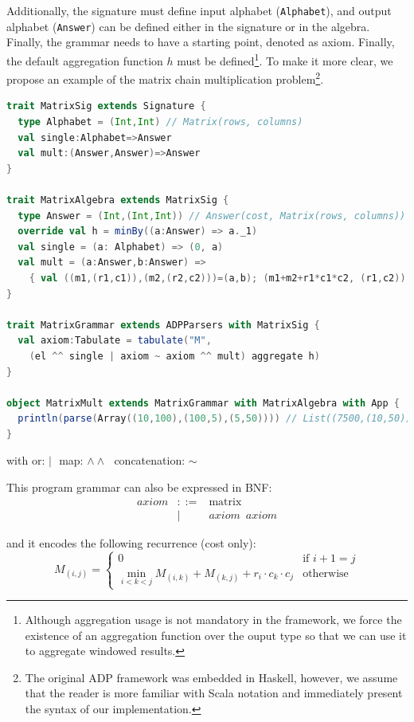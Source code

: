 Additionally, the signature must define input alphabet ({\tt Alphabet}), and output alphabet ({\tt Answer}) can be defined either in the signature or in the algebra. Finally, the grammar needs to have a starting point, denoted as axiom. Finally, the default aggregation function $h$ must be defined\footnote{Although aggregation usage is not mandatory in the framework, we force the existence of an aggregation function over the ouput type so that we can use it to aggregate windowed results.}. To make it more clear, we propose an example of the matrix chain multiplication problem\footnote{The original ADP framework was embedded in Haskell, however, we assume that the reader is more familiar with Scala notation and immediately present the syntax of our implementation.}.

\newpage
\begin{lstlisting}[language=Scala, caption=Matrix chain mulitiplication DSL implementation]
trait MatrixSig extends Signature {
  type Alphabet = (Int,Int) // Matrix(rows, columns)
  val single:Alphabet=>Answer
  val mult:(Answer,Answer)=>Answer
}

trait MatrixAlgebra extends MatrixSig {
  type Answer = (Int,(Int,Int)) // Answer(cost, Matrix(rows, columns))
  override val h = minBy((a:Answer) => a._1)
  val single = (a: Alphabet) => (0, a)
  val mult = (a:Answer,b:Answer) =>
    { val ((m1,(r1,c1)),(m2,(r2,c2)))=(a,b); (m1+m2+r1*c1*c2, (r1,c2)) }
}

trait MatrixGrammar extends ADPParsers with MatrixSig {
  val axiom:Tabulate = tabulate("M",
    (el ^^ single | axiom ~ axiom ^^ mult) aggregate h)
}

object MatrixMult extends MatrixGrammar with MatrixAlgebra with App {
  println(parse(Array((10,100),(100,5),(5,50)))) // List((7500,(10,50)))
}
\end{lstlisting}
\begin{center}\vspace{-18pt} with or: $|\,\,$ map: $\land\land\,\,$ concatenation: $\sim$ \end{center}

This program grammar can also be expressed in BNF:
\[\begin{array}{lrl}
axiom &::=& \text{matrix} \\
 &|& axiom \,\,\, axiom
\end{array}\]

and it encodes the following recurrence (cost only):
	\[M_{(i,j)}=\left\{\begin{array}{ll}
		0 & \text{if } i+1= j\\
		\min_{i<k<j} M_{(i,k)}+M_{(k,j)}+r_i \cdot c_k \cdot c_j & \text{otherwise}
	\end{array}\right. \]


